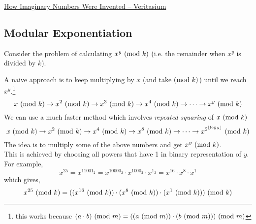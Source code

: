 \begin{funvideo}
\href{https://youtu.be/cUzklzVXJwo}{How Imaginary Numbers Were Invented -- Veritasium}
\end{funvideo}
\recalctypearea
\subsection{Modular Exponentiation}
Consider the problem of calculating $x^y\ (\mathrm{mod}\ k)$ (i.e. the remainder when $x^y$ is divided by $k$).

A naive approach is to keep multiplying by $x$ (and take$\ (\mathrm{mod}\ k)$) until we reach $x^y$.\footnote{this works because $(a\cdot b)\ (\mathrm{mod}\ m) =  ((a\ (\mathrm{mod}\ m))\cdot(b\ (\mathrm{mod}\ m)))\ (\mathrm{mod}\ m)$}
\begin{equation*}
x \ (\mathrm{mod}\ k) \rightarrow x^2 \ (\mathrm{mod}\ k) \rightarrow x^3 \ (\mathrm{mod}\ k) \rightarrow x^4 \ (\mathrm{mod}\ k) \rightarrow \cdots \rightarrow x^y \ (\mathrm{mod}\ k)
\end{equation*}
We can use a much faster method which involves \emph{repeated squaring} of $x \ (\mathrm{mod}\ k)$
\begin{equation}
x \ (\mathrm{mod}\ k) \rightarrow x^2 \ (\mathrm{mod}\ k) \rightarrow x^4 \ (\mathrm{mod}\ k) \rightarrow x^8 \ (\mathrm{mod}\ k) \rightarrow \cdots \rightarrow x^{2^{\lfloor\log y\rfloor}} \ (\mathrm{mod}\ k)
\end{equation}
The idea is to multiply some of the above numbers and get $x^y \ (\mathrm{mod}\ k)$.\\
This is achieved by choosing all powers that have 1 in binary representation of $y$.\\
For example,
\begin{equation*}
x^{25} = x ^ {11001_2} = x ^ {10000_2} \cdot x ^ {1000_2} \cdot x ^ {1_2} = x ^ {16} \cdot x ^ 8 \cdot x ^ 1
\end{equation*}
which gives,
\begin{equation*}
x^{25} \ (\mathrm{mod}\ k)  = ((x ^ {16} \ (\mathrm{mod}\ k))\cdot (x ^ 8\ (\mathrm{mod}\ k))  \cdot (x ^ 1\ (\mathrm{mod}\ k))) \ (\mathrm{mod}\ k)
\end{equation*}

